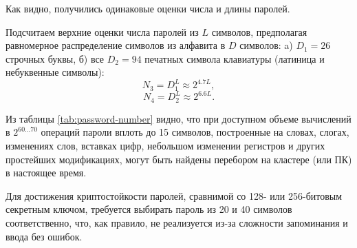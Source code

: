 \documentclass[10pt,a4paper]{book}
\begin{document}
Как видно, получились одинаковые оценки числа и длины паролей.

Подсчитаем верхние оценки числа паролей из $L$ символов, предполагая равномерное распределение символов из алфавита в $D$ символов: a) $D_1 = 26$ строчных буквы, б) все $D_2 = 94$ печатных символа клавиатуры (латиница и небуквенные символы):
    \[ N_3 = D_1^L \approx 2^{4.7 L}, \]
    \[ N_4 = D_2^L \approx 2^{6.6 L}. \]

\begin{table}[h!]
    \centering
    \caption{Различные верхние оценки числа паролей\label{tab:password-number}}
\end{table}

Из таблицы \ref{tab:password-number} видно, что при доступном объеме вычислений в $2^{60 \ldots 70}$ операций пароли вплоть до 15 символов, построенные на словах, слогах, изменениях слов, вставках цифр, небольшом изменении регистров и других простейших модификациях, могут быть найдены перебором на кластере (или ПК) в настоящее время.

Для достижения криптостойкости паролей, сравнимой со 128- или 256-битовым секретным ключом, требуется выбирать пароль из 20 и 40 символов соответственно, что, как правило, не реализуется из-за сложности запоминания и ввода без ошибок.
\end{document}
